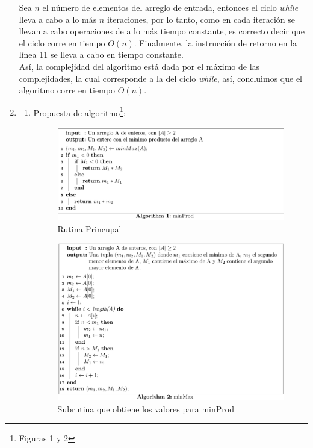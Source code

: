 \documentclass[a4paper, 12pt]{report}
\begin{document}
\begin{enumerate}
{\begin{enumerate}
        Sea $n$ el número de elementos del arreglo de entrada, entonces el ciclo
        {\it while} lleva a cabo a lo más $n$ iteraciones, por lo tanto,
        como en cada iteración se llevan a cabo operaciones de a lo más tiempo
        constante, es correcto decir que el ciclo corre en tiempo $O(n)$.
        Finalmente, la instrucción de retorno en la línea 11 se lleva a cabo en
        tiempo constante.\\
        Así, la complejidad del algoritmo está dada por el máximo de las
        complejidades, la cual corresponde a la del ciclo {\it while}, así,
        concluimos que el algoritmo corre en tiempo $O(n)$.


\end{enumerate}
}
\item[3)]{
\begin{enumerate}
    \item[1)]{
        Propuesta de algoritmo\footnote{Figuras 1 y 2}:\\
        \begin{figure}[h!]
            \caption{Rutina Princupal}
            \centering
            \includegraphics[width=\textwidth]{images/minProd.png}
        \end{figure}
        \begin{figure}[h!]
            \caption{Subrutina que obtiene los valores para minProd}
            \centering
            \includegraphics[width=\textwidth]{images/minMax.png}
        \end{figure}


}
\end{enumerate}}
\end{enumerate}
\end{document}
